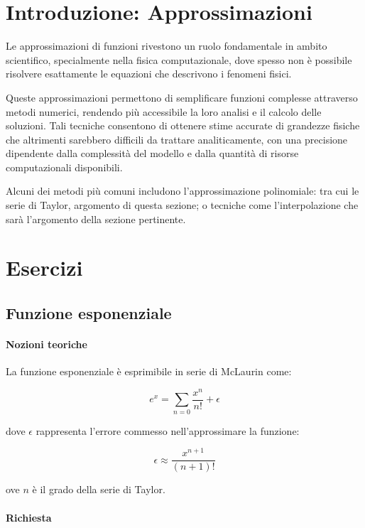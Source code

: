 \section{Introduzione: Approssimazioni}

Le approssimazioni di funzioni rivestono un ruolo fondamentale in ambito scientifico,
specialmente nella fisica computazionale, dove spesso non è possibile risolvere
esattamente le equazioni che descrivono i fenomeni fisici.

Queste approssimazioni permettono di semplificare funzioni complesse attraverso
metodi numerici, rendendo più accessibile la loro analisi e il calcolo delle
soluzioni.
Tali tecniche consentono di ottenere stime accurate di grandezze fisiche che
altrimenti sarebbero difficili da trattare analiticamente, con una precisione
dipendente dalla complessità del modello e dalla quantità di risorse computazionali
disponibili.

Alcuni dei metodi più comuni includono l'approssimazione polinomiale: tra cui
le serie di Taylor, argomento di questa sezione; o tecniche come l'interpolazione
che sarà l'argomento della sezione pertinente.

\section{Esercizi}


\subsection{Funzione esponenziale}

\paragraph{Nozioni teoriche}

La funzione esponenziale è esprimibile in serie di McLaurin come:

$$
	e^x = \sum_{n=0} \frac{x^n}{n!} + \epsilon
$$

dove $\epsilon$ rappresenta l'errore commesso nell'approssimare la funzione:

$$
	\epsilon \approx \frac{x^{n+1}}{(n+1)!}
$$

ove $n$ è il grado della serie di Taylor.

\paragraph{Richiesta}

